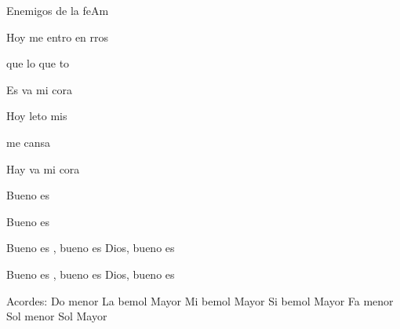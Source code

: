 \documentclass[12pt, spanish]{book}
\begin{document}
\begin{song}{Enemigos de la fe}{Am}
\begin{SBExtraKeys}
{            \begin{SBChorus}
                Hoy me entro en rros

                que lo que to

                Es va  mi cora

                Hoy leto mis 

                 me cansa

                Hay va  mi cora
            \end{SBChorus}

            \begin{SBOpGroup}
                Bueno es 

                Bueno es 

                Bueno es , bueno es Dios, bueno es 

                Bueno es , bueno es Dios, bueno es 
            \end{SBOpGroup}

            \ifChordBk
            \begin{SBOpGroup}
                Acordes:\break
                \upchord{\Cm}\qquad Do menor \hfill
                \upchord{\Aflat}\qquad La bemol Mayor \hfill\null\break
                \upchord{\Eflat}\qquad Mi bemol Mayor  \hfill
                \upchord{\Bflat}\qquad Si bemol Mayor \hfill\null\break
                \upchord{\Fm}\qquad Fa menor \hfill
                \upchord{\Gm}\qquad Sol menor \hfill\null\break
                \upchord{\G}\qquad Sol Mayor \hfill
                 \hfill\null\break
            \end{SBOpGroup}
            \fi
        }\end{SBExtraKeys}
    \end{song}
\end{document}
